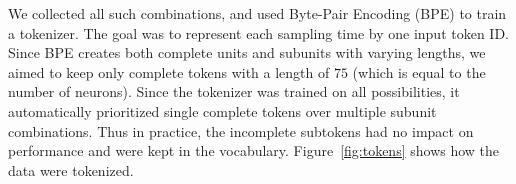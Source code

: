 \documentclass[../CLthesis.tex]{subfiles}
\begin{document}
We collected all such combinations, and used Byte-Pair Encoding (BPE) to train a tokenizer. The goal was to represent each sampling time by one input token ID. Since BPE creates both complete units and subunits with varying lengths, we aimed to keep only complete tokens with a length of $75$ (which is equal to the number of neurons). Since the tokenizer was trained on all possibilities, it automatically prioritized single complete tokens over multiple subunit combinations. Thus in practice, the incomplete subtokens had no impact on performance and were kept in the vocabulary. Figure~\ref{fig:tokens} shows how the data were tokenized.
\begin{figure}[H]
\centering
{}
\end{figure}
\end{document}
